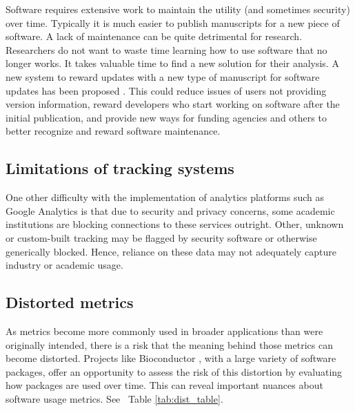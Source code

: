 \documentclass{article}
\begin{document}
Software requires extensive work to maintain the utility (and sometimes security) over time. Typically it is much easier to publish manuscripts for a new piece of software. A lack of maintenance can be quite detrimental for research. Researchers do not want to waste time learning how to use software that no longer works. It takes valuable time to find a new solution for their analysis. A new system to reward updates with a new type of manuscript for software updates has been proposed \cite{merow_better_2023}. This could reduce issues of users not providing version information, reward developers who start working on software after the initial publication, and provide new ways for funding agencies and others to better recognize and reward software maintenance. 

\subsection{Limitations of tracking systems}

One other difficulty with the implementation of analytics platforms such as Google Analytics is that due to security and privacy concerns, some academic institutions are blocking connections to these services outright. Other, unknown or custom-built tracking may be flagged by security software or otherwise generically blocked. Hence, reliance on these data may not adequately capture industry or academic usage.

\subsection{Distorted metrics}

As metrics become more commonly used in broader applications than were originally intended, there is a risk that the meaning behind those metrics can become distorted. Projects like Bioconductor \cite{bioconductor}, with a large variety of software packages, offer an opportunity to assess the risk of this distortion by evaluating how packages are used over time. This can reveal important nuances about software usage metrics. See ~Table \ref{tab:dist_table}.
\end{document}
